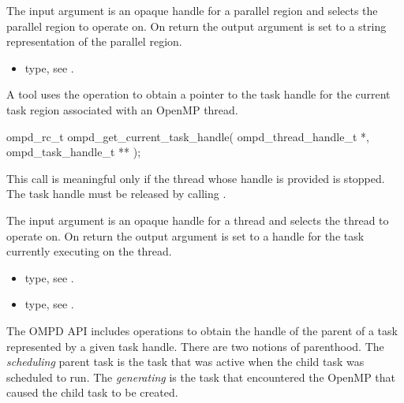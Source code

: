 \argdesc
The input argument  is an opaque handle for a parallel region and selects the parallel region to operate on.
On return the output argument  is set to a string representation of the parallel region.

\crossreferences
\begin{itemize}
	\item {} type, see .
\end{itemize}


\label{ompd:ompd_get_current_task_handle}
\summary
A tool uses the  operation to obtain a pointer to the 
task handle for the current task region associated with an OpenMP thread.

\format

\begin{cspecific}
\begin{ompSyntax}
ompd_rc_t ompd_get_current_task_handle(
  ompd_thread_handle_t *,
  ompd_task_handle_t **
);
\end{ompSyntax}
\end{cspecific}


\descr
This call is meaningful only if the thread whose handle is provided is stopped.
The task handle must be released by calling .

\argdesc
The input argument  is an opaque handle for a thread and selects the thread to operate on.
On return the output argument  is set to a handle for the task
currently executing on the thread.

\crossreferences
\begin{itemize}
	\item {} type, see .
	\item {} type, see .
\end{itemize}

The OMPD API includes operations to obtain the handle of the parent of a task represented by a 
given task handle. There are two notions of parenthood. The \emph{scheduling} parent task is the 
task that was active when the child task was scheduled to run. The \emph{generating} is the task 
that encountered the OpenMP that caused the child task to be created.

